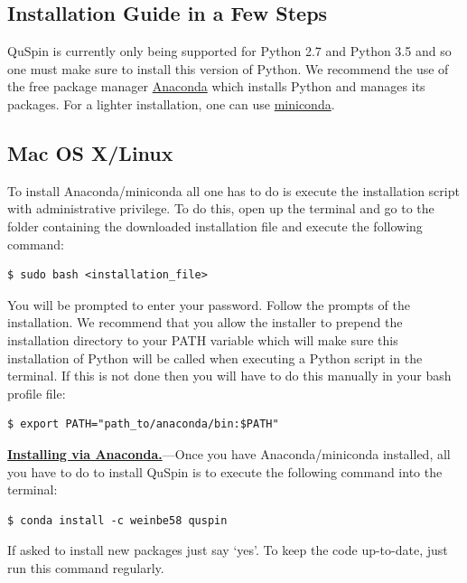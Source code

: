 \documentclass{SciPost}
\newcommand\0{\scalebox{-1}[1]{0}}
\let\svttfamily\ttfamily
\renewcommand\ttfamily{\svttfamily\catcode`0=\active }
\begin{document}
\begin{appendix}

\section{Installation Guide in a Few Steps}
\label{app:install}

QuSpin is currently only being supported for Python 2.7 and Python 3.5 and so one must make sure to install this version of Python. We recommend the use of the free package manager \href{https://www.continuum.io/downloads}{Anaconda} which installs Python and manages its packages. For a lighter installation, one can use \href{http://conda.pydata.org/miniconda.html}{miniconda}.

\subsection{Mac OS X/Linux}
To install Anaconda/miniconda all one has to do is execute the installation script with administrative privilege. To do this, open up the terminal and go to the folder containing the downloaded installation file and execute the following command: 
\begin{lstlisting}[numbers=none,keywordstyle=\ttfamily]
$ sudo bash <installation_file>
\end{lstlisting}
You will be prompted to enter your password. Follow the prompts of the installation. We recommend that you allow the installer to prepend the installation directory to your PATH variable which will make sure this installation of Python will be called when executing a Python script in the terminal. If this is not done then you will have to do this manually in your bash profile file:
\begin{lstlisting}[numbers=none,keywordstyle=\ttfamily]
$ export PATH="path_to/anaconda/bin:$PATH"
\end{lstlisting}

\underline{\bf Installing via Anaconda.}---Once you have Anaconda/miniconda installed, all you have to do to install QuSpin is to execute the following command into the terminal: 
\begin{lstlisting}[numbers=none,keywordstyle=\ttfamily]
$ conda install -c weinbe58 quspin
\end{lstlisting}
If asked to install new packages just say `yes'. To keep the code up-to-date, just run this command regularly. 


\end{appendix}
\end{document}

